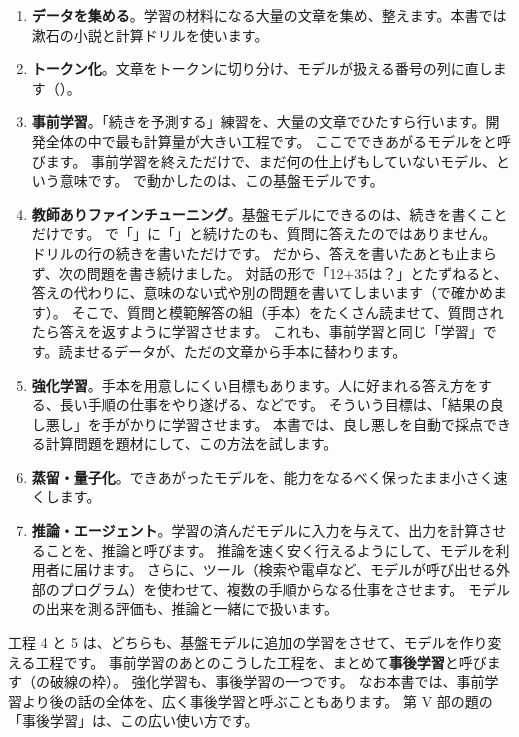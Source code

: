 \begin{enumerate}
\item \textbf{データを集める}。学習の材料になる大量の文章を集め、整えます。本書では漱石の小説と計算ドリルを使います。
\item \textbf{トークン化}。文章をトークンに切り分け、モデルが扱える番号の列に直します（）。
\item \textbf{事前学習}。「続きを予測する」練習を、大量の文章でひたすら行います。開発全体の中で最も計算量が大きい工程です。
ここでできあがるモデルをと呼びます。
事前学習を終えただけで、まだ何の仕上げもしていないモデル、という意味です。
で動かしたのは、この基盤モデルです。
\item \textbf{教師ありファインチューニング}。基盤モデルにできるのは、続きを書くことだけです。
で「」に「」と続けたのも、質問に答えたのではありません。
ドリルの行の続きを書いただけです。
だから、答えを書いたあとも止まらず、次の問題を書き続けました。
対話の形で「12+35は？」とたずねると、答えの代わりに、意味のない式や別の問題を書いてしまいます（で確かめます）。
そこで、質問と模範解答の組（手本）をたくさん読ませて、質問されたら答えを返すように学習させます。
これも、事前学習と同じ「学習」です。読ませるデータが、ただの文章から手本に替わります。
\item \textbf{強化学習}。手本を用意しにくい目標もあります。人に好まれる答え方をする、長い手順の仕事をやり遂げる、などです。
そういう目標は、「結果の良し悪し」を手がかりに学習させます。
本書では、良し悪しを自動で採点できる計算問題を題材にして、この方法を試します。
\item \textbf{蒸留・量子化}。できあがったモデルを、能力をなるべく保ったまま小さく速くします。
\item \textbf{推論・エージェント}。学習の済んだモデルに入力を与えて、出力を計算させることを、推論と呼びます。
推論を速く安く行えるようにして、モデルを利用者に届けます。
さらに、ツール（検索や電卓など、モデルが呼び出せる外部のプログラム）を使わせて、複数の手順からなる仕事をさせます。
モデルの出来を測る評価も、推論と一緒にで扱います。
\end{enumerate}

工程 4 と 5 は、どちらも、基盤モデルに追加の学習をさせて、モデルを作り変える工程です。
事前学習のあとのこうした工程を、まとめて\textbf{事後学習}と呼びます（の破線の枠）。
強化学習も、事後学習の一つです。
なお本書では、事前学習より後の話の全体を、広く事後学習と呼ぶこともあります。
第 V 部の題の「事後学習」は、この広い使い方です。

